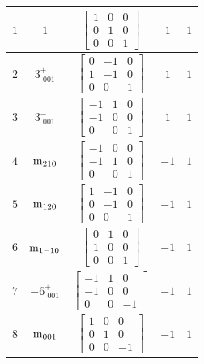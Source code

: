 \documentclass[fleqn,8pt]{jsarticle}
\begin{document}
\begin{longtable}{ccccc}
$ 1 $ & $ 1 $ & $ \begin{bmatrix} 1 & 0 & 0 \\ 0 & 1 & 0 \\ 0 & 0 & 1 \end{bmatrix} $ & $ 1 $ & $ 1 $ \\ \hline
$ 2 $ & $ 3^{+}_{\,\,001} $ & $ \begin{bmatrix} 0 & -1 & 0 \\ 1 & -1 & 0 \\ 0 & 0 & 1 \end{bmatrix} $ & $ 1 $ & $ 1 $ \\ \hline
$ 3 $ & $ 3^{-}_{\,\,001} $ & $ \begin{bmatrix} -1 & 1 & 0 \\ -1 & 0 & 0 \\ 0 & 0 & 1 \end{bmatrix} $ & $ 1 $ & $ 1 $ \\ \hline
$ 4 $ & $ {\rm m}_{210} $ & $ \begin{bmatrix} -1 & 0 & 0 \\ -1 & 1 & 0 \\ 0 & 0 & 1 \end{bmatrix} $ & $ -1 $ & $ 1 $ \\ \hline
$ 5 $ & $ {\rm m}_{120} $ & $ \begin{bmatrix} 1 & -1 & 0 \\ 0 & -1 & 0 \\ 0 & 0 & 1 \end{bmatrix} $ & $ -1 $ & $ 1 $ \\ \hline
$ 6 $ & $ {\rm m}_{1-10} $ & $ \begin{bmatrix} 0 & 1 & 0 \\ 1 & 0 & 0 \\ 0 & 0 & 1 \end{bmatrix} $ & $ -1 $ & $ 1 $ \\ \hline
$ 7 $ & $ -6^{+}_{\,\,001} $ & $ \begin{bmatrix} -1 & 1 & 0 \\ -1 & 0 & 0 \\ 0 & 0 & -1 \end{bmatrix} $ & $ -1 $ & $ 1 $ \\ \hline
$ 8 $ & $ {\rm m}_{001} $ & $ \begin{bmatrix} 1 & 0 & 0 \\ 0 & 1 & 0 \\ 0 & 0 & -1 \end{bmatrix} $ & $ -1 $ & $ 1 $ \\ \hline

\end{longtable}
\end{document}

